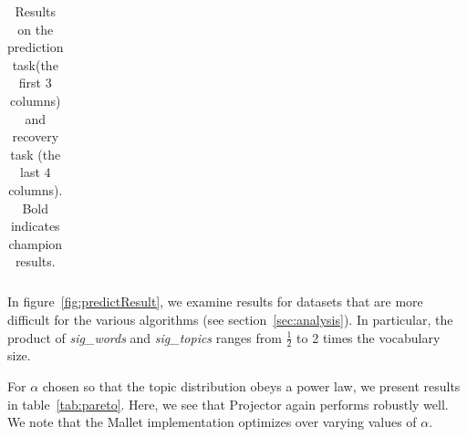 \begin{table}
{\begin{tabular}{|c|c|c|c|c|c|c|c|c|}
\end{tabular}

}
\caption{Results on the prediction task(the first $3$ columns) and recovery task (the last $4$ columns). Bold indicates champion results.}
\label{tab:cosine}
\end{table}


In figure~\ref{fig:predictResult}, we examine results for datasets
that are more difficult for the various algorithms (see
section~\ref{sec:analysis}).  In particular, the product of {\em
sig\_words} and {\em sig\_topics} ranges from $\frac{1}{2}$ to 2
times the vocabulary size.

For $\alpha$ chosen so that the topic distribution obeys a power
law, we present results in table~\ref{tab:pareto}. Here, we see that
Projector again performs robustly well.  We note that 
the Mallet implementation optimizes over varying values of
$\alpha$. 

